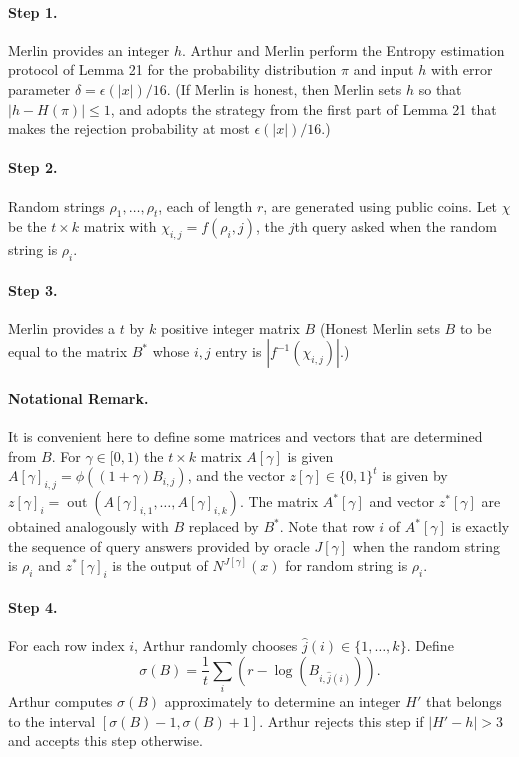\documentclass[10pt,a4paper]{article}
\begin{document}
\paragraph{Step 1.} Merlin provides an integer $h$. Arthur and Merlin perform the Entropy estimation protocol of Lemma 21 for the probability distribution $\pi$ and input $h$ with error parameter $\delta=\epsilon(|x|)/16$. (If Merlin is honest, then Merlin sets $h$ so that $|h-H(\pi)|\le1$, and adopts the strategy from the first part of Lemma 21 that makes the rejection probability at most $\epsilon(|x|)/16$.)
\paragraph{Step 2.} Random strings $\rho_1,\ldots,\rho_t$, each of length $r$, are generated using public coins. Let $\chi$ be the $t\times k$ matrix with $\chi_{i,j}=f(\rho_i,j)$, the $j$th query asked when the random string is $\rho_i$.
\paragraph{Step 3.} Merlin provides a $t$ by $k$ positive integer matrix $B$ (Honest Merlin sets $B$ to be equal to the matrix $B^*$ whose $i,j$ entry is $|f^{-1}(\chi_{i,j})|$.)
\paragraph{Notational Remark.} It is convenient here to define some matrices and vectors that are determined from $B$. For $\gamma\in[0,1)$ the $t\times k$ matrix $A[\gamma]$ is given $A[\gamma]_{i,j}=\phi((1+\gamma)B_{i,j})$, and the vector $z[\gamma]\in\{0,1\}^t$ is given by $z[\gamma]_i=\operatorname{out}(A[\gamma]_{i,1},\ldots,A[\gamma]_{i,k})$. The matrix $A^*[\gamma]$ and vector $z^*[\gamma]$ are obtained analogously with $B$ replaced by $B^*$. Note that row $i$ of $A^*[\gamma]$ is exactly the sequence of query answers provided by oracle $J[\gamma]$ when the random string is $\rho_i$ and $z^*[\gamma]_i$ is the output of $N^{J[\gamma]}(x)$ for random string is $\rho_i$.
\paragraph{Step 4.} For each row index $i$, Arthur randomly chooses $\hat j(i)\in\{1,\ldots,k\}$. Define
\[\sigma(B)=\frac1t\sum_i(r-\log(B_{i,\hat j(i)})).\]
Arthur computes $\sigma(B)$ approximately to determine an integer $H'$ that belongs to the interval $[\sigma(B)-1,\sigma(B)+1]$. Arthur rejects this step if $|H'-h|>3$ and accepts this step otherwise.
\end{document}
